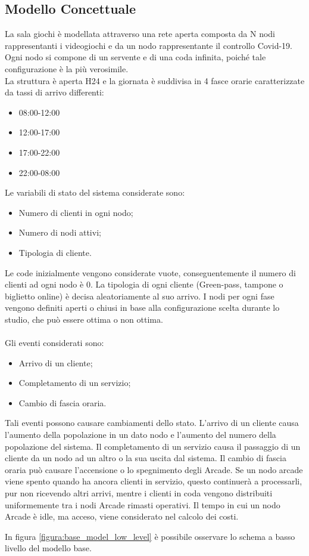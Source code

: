\documentclass{article}
\begin{document}
\subsection{Modello Concettuale}
La sala giochi è modellata attraverso una rete aperta composta da N nodi rappresentanti i videogiochi e da un nodo rappresentante il controllo Covid-19. Ogni nodo si compone di un servente e di una coda infinita, poiché tale configurazione è la più verosimile.
\\
La struttura è aperta H24 e la giornata è suddivisa in 4 fasce orarie caratterizzate da tassi di arrivo differenti:
\begin{itemize}
\item 08:00-12:00
\item 12:00-17:00
\item 17:00-22:00
\item 22:00-08:00



\end{itemize}
Le variabili di stato del sistema considerate sono:
\begin{itemize}
\item Numero di clienti in ogni nodo;
\item Numero di nodi attivi;
\item Tipologia di cliente.
\end{itemize}
Le code inizialmente vengono considerate vuote, conseguentemente il numero di
clienti ad ogni nodo è 0. La tipologia di ogni cliente (Green-pass, tampone o biglietto online) è decisa aleatoriamente al suo arrivo. I nodi per ogni fase vengono definiti aperti o chiusi in base alla configurazione scelta durante lo studio, che può essere ottima o non
ottima.
\\ \\
Gli eventi considerati sono:
\begin{itemize}
\item Arrivo di un cliente;
\item Completamento di un servizio;
\item Cambio di fascia oraria.
\end{itemize}
Tali eventi possono causare cambiamenti dello stato. L’arrivo di un cliente causa
l’aumento della popolazione in un dato nodo e l’aumento del numero della popolazione del sistema. Il completamento di un servizio causa il passaggio di un cliente da un
nodo ad un altro o la sua uscita dal sistema. Il cambio di fascia oraria può causare
l’accensione o lo spegnimento degli Arcade. Se un nodo arcade viene spento quando ha ancora
clienti in servizio, questo continuerà a processarli, pur non ricevendo altri
arrivi, mentre i clienti in coda vengono distribuiti uniformemente tra i nodi Arcade rimasti operativi. Il tempo in cui un nodo Arcade è idle, ma acceso, viene considerato nel calcolo dei
costi.
\par In figura \ref{figura:base_model_low_level} è possibile osservare lo schema a basso livello del modello base. 
\end{document}

